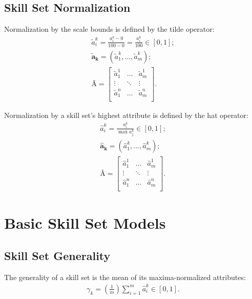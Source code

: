 \documentclass{elsarticle} %
\begin{document}
\subsection{Skill Set Normalization}
Normalization by the scale bounds is defined by the tilde operator:
\begin{gather}
    \tilde{a}_{i}^{k} =
    \frac{a_{i}^{k} - 0}{100 - 0} =
    \frac{a_{i}^{k}}{100}
    \in [0,1]
    ;\\
    \boldsymbol{\tilde{a}_{k}} =
    (\tilde{a}_{1}^{k}, \dots, \tilde{a}_{m}^{k})
    ;\\
    \textbf{Ã} =
    \begin{bmatrix}
        \tilde{a}_{1}^{1} & \hdots & \tilde{a}_{m}^{1} \\
        \vdots            & \ddots & \vdots            \\
        \tilde{a}_{1}^{n} & \hdots & \tilde{a}_{m}^{n} \\
    \end{bmatrix}
    .
\end{gather}

Normalization by a skill set's highest attribute is defined by the hat
operator:
\begin{gather}
    \hat{a}_{i}^{k} =
    \frac{a_{i}^{k}}{\max{a_{j}^{k}}}
    \in [0,1]
    ;\\
    \boldsymbol{\hat{a}_{k}} =
    (\hat{a}_{1}^{k}, \dots, \hat{a}_{m}^{k})
    ;\\
    \textbf{Â} =
    \begin{bmatrix}
        \hat{a}_{1}^{1} & \hdots & \hat{a}_{m}^{1} \\
        \vdots          & \ddots & \vdots          \\
        \hat{a}_{1}^{n} & \hdots & \hat{a}_{m}^{n} \\
    \end{bmatrix}
    .
\end{gather}


\section{Basic Skill Set Models}
\subsection{Skill Set Generality}
The generality of a skill set is the mean of its maxima-normalized attributes:
\begin{gather}
    \gamma_{k} = \left(\frac{1}{m}\right)\sum_{i=1}^{m}{\hat{a}_{i}^{k}}
    \in [0,1]
    .
\end{gather}
\end{document}
